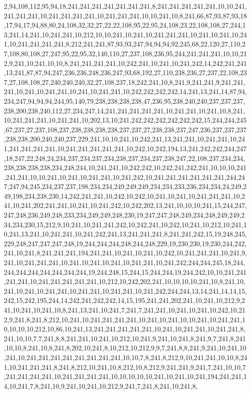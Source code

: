 2,94,108,112,95,94,18,241,241,241,241,241,241,241,8,241,241,241,241,241,10,10,241,241,241,241,10,241,241,241,241,10,241,241,241,10,10,241,10,8,241,66,87,93,87,93,18,17,94,17,94,88,80,24,108,32,32,27,22,22,108,95,22,95,24,108,23,22,108,108,27,244,13,241,14,241,10,241,241,10,212,10,10,241,10,241,10,241,241,241,10,241,10,241,10,241,10,241,241,241,241,8,212,241,241,87,93,93,247,94,94,94,92,245,68,22,120,27,110,27,108,80,108,27,247,95,22,95,32,140,110,27,237,108,236,95,244,241,241,241,10,10,212,9,241,10,241,10,10,8,241,241,241,241,10,242,241,10,241,10,241,242,14,242,241,241,13,241,87,87,94,247,236,236,248,236,247,93,68,192,27,110,238,236,27,237,22,108,237,27,108,108,27,240,240,240,32,27,108,237,18,242,241,10,8,241,9,241,241,9,241,241,241,10,241,10,241,241,10,241,10,241,241,10,242,242,242,242,14,241,13,241,14,87,94,234,247,94,94,94,244,95,140,79,238,238,238,238,47,236,95,238,240,240,237,237,237,238,200,238,240,112,27,234,247,14,241,241,241,241,241,10,241,241,10,241,10,8,241,10,241,241,241,10,241,241,10,202,13,10,241,242,242,242,242,242,242,15,244,244,245,67,237,27,237,108,237,238,238,238,238,237,237,27,238,238,237,247,236,237,237,237,238,238,200,240,240,237,229,241,10,10,241,10,242,241,13,241,241,10,241,241,10,241,241,241,241,241,10,241,241,241,241,241,10,242,10,242,194,13,241,242,242,244,247,18,247,22,248,24,234,237,234,237,234,238,237,234,237,238,247,22,108,237,234,234,238,238,238,238,234,248,244,10,241,241,10,242,242,10,242,241,242,241,10,10,10,241,241,241,10,10,241,10,241,10,241,241,10,241,242,10,241,241,241,241,241,241,244,247,247,94,245,234,237,237,198,234,234,249,249,249,234,234,233,236,234,234,24,249,249,198,234,238,230,14,242,241,241,10,242,10,242,10,241,10,241,10,241,241,241,10,241,10,241,202,241,241,10,241,10,241,242,10,242,202,13,241,10,10,10,241,15,244,247,247,248,236,249,248,233,234,249,249,248,230,19,247,247,248,249,234,248,249,249,234,234,230,15,212,9,10,241,10,241,241,242,10,242,241,10,242,10,241,10,212,10,241,10,241,13,241,10,241,241,10,241,242,241,13,241,241,241,8,241,241,242,15,19,248,245,229,248,247,247,247,248,19,244,244,244,248,244,248,229,19,230,230,19,230,244,242,241,10,241,8,241,241,241,194,241,241,10,241,10,241,10,242,10,241,241,241,10,241,9,241,10,241,241,241,10,241,10,241,10,241,10,241,241,10,241,242,244,244,245,18,244,244,244,244,244,244,244,244,19,244,248,15,244,15,244,244,19,244,242,10,10,241,241,241,241,10,241,241,241,241,241,10,212,10,242,202,241,10,10,10,10,241,10,8,241,10,241,10,241,10,241,241,10,241,241,10,241,241,10,241,242,244,244,13,14,241,14,14,15,242,15,242,195,244,14,242,241,242,242,14,15,195,241,241,202,241,10,241,10,212,9,241,10,241,10,241,10,8,241,13,241,10,241,7,241,7,241,241,10,241,10,241,10,242,10,212,9,241,8,241,8,212,10,241,10,241,241,241,241,10,241,10,241,10,10,241,10,241,241,10,10,10,10,212,10,86,10,241,13,241,241,241,241,241,10,241,10,241,241,10,241,241,8,241,10,10,7,7,241,8,8,241,241,10,241,10,212,10,241,9,241,10,241,8,241,9,7,241,8,241,10,10,8,241,10,8,241,8,202,10,241,8,10,212,10,212,9,9,7,241,8,8,241,9,241,10,241,10,241,10,241,241,241,241,241,241,241,241,10,10,7,8,241,8,212,9,10,241,241,10,10,8,241,10,241,241,241,8,241,8,212,10,241,10,8,212,10,8,212,9,241,241,9,241,7,241,10,10,7,241,241,241,241,10,241,241,241,241,10,10,10,10,10,241,10,241,10,241,194,241,241,14,10,241,7,8,241,10,9,241,10,241,10,212,9,241,7,241,8,241,10,241,8,